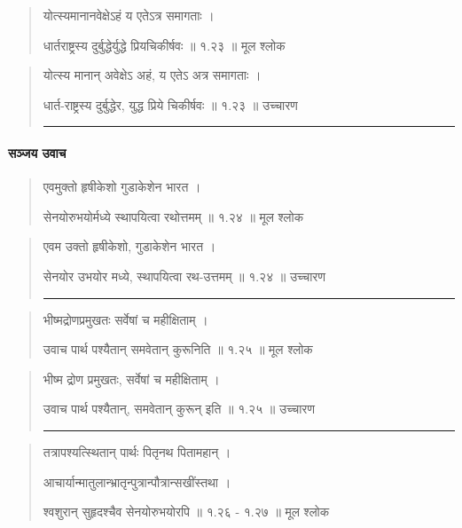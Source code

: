 \begin{quotation} 

योत्स्यमानानवेक्षेऽहं य एतेऽत्र समागताः  ।  

धार्तराष्ट्रस्य दुर्बुद्धेर्युद्धे प्रियचिकीर्षवः  ॥ १.२३ ॥  मूल श्लोक
\end{quotation}

\begin{quotation}

योत्स्य मानान् अवेक्षेऽ अहं, य एतेऽ अत्र समागताः  ।  

धार्त-राष्ट्रस्य दुर्बुद्धेर, युद्ध प्रिये चिकीर्षवः  ॥ १.२३ ॥  उच्चारण

\noindent\rule{16cm}{0.4pt} 
\end{quotation}


\paragraph{\sanskrit सञ्जय उवाच}
\begin{quotation} 


एवमुक्तो हृषीकेशो गुडाकेशेन भारत  ।  

सेनयोरुभयोर्मध्ये स्थापयित्वा रथोत्तमम्‌  ॥ १.२४ ॥  मूल श्लोक
\end{quotation}

\begin{quotation}

एवम उक्तो हृषीकेशो, गुडाकेशेन भारत  ।  

सेनयोर उभयोर मध्ये, स्थापयित्वा रथ-उत्तमम्  ॥ १.२४ ॥  उच्चारण

\noindent\rule{16cm}{0.4pt} 
\end{quotation}


\begin{quotation} 

भीष्मद्रोणप्रमुखतः सर्वेषां च महीक्षिताम्‌  ।  

उवाच पार्थ पश्यैतान्‌ समवेतान्‌ कुरूनिति  ॥ १.२५ ॥  मूल श्लोक
\end{quotation}

\begin{quotation}

भीष्म द्रोण प्रमुखतः, सर्वेषां च महीक्षिताम्  ।  

उवाच पार्थ पश्यैतान्, समवेतान् कुरून् इति  ॥ १.२५ ॥  उच्चारण

\noindent\rule{16cm}{0.4pt} 
\end{quotation}


\begin{quotation} 

तत्रापश्यत्स्थितान्‌ पार्थः पितृनथ पितामहान्‌  ।  

आचार्यान्मातुलान्भ्रातृन्पुत्रान्पौत्रान्सखींस्तथा  ।  

श्वशुरान्‌ सुहृदश्चैव सेनयोरुभयोरपि  ॥ १.२६ - १.२७ ॥  मूल श्लोक
\end{quotation}

